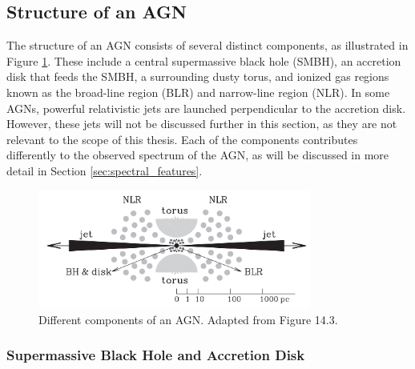 \subsection{Structure of an AGN}
\label{sec:agn_structure}

The structure of an AGN consists of several distinct components, as illustrated in Figure \ref{fig:agn_structure_mo}. These include a central supermassive black hole (SMBH), an accretion disk that feeds the SMBH, a surrounding dusty torus, and ionized gas regions known as the broad-line region (BLR) and narrow-line region (NLR). In some AGNs, powerful relativistic jets are launched perpendicular to the accretion disk. However, these jets will not be discussed further in this section, as they are not relevant to the scope of this thesis. Each of the components contributes differently to the observed spectrum of the AGN, as will be discussed in more detail in Section \ref{sec:spectral_features}.


\begin{figure}[!ht]
	\centering
	\includegraphics[width=0.8\textwidth]{pictures/Chapter2/AGN_standard_paradigm.png}
	\caption{Different components of an AGN. Adapted from \textcite{mo2010galaxy} Figure 14.3.}
	\label{fig:agn_structure_mo}
\end{figure}

\subsubsection{Supermassive Black Hole and Accretion Disk}


